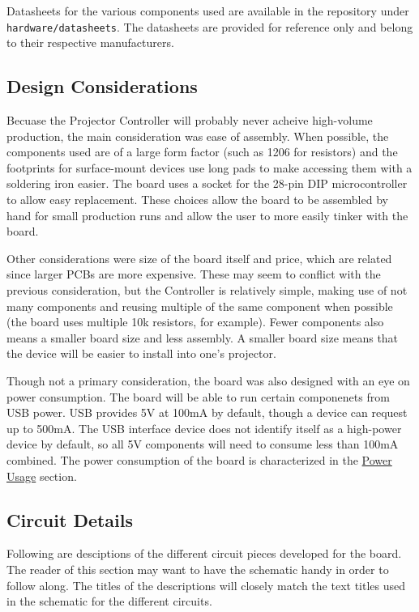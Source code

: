 \documentclass{article}
\begin{document}
Datasheets for the various components used are available in the repository under
\texttt{hardware/datasheets}.  The datasheets are provided for reference only and belong to their
respective manufacturers.

\subsection{Design Considerations} \label{ssec:DesignConsid}
Becuase the Projector Controller will probably never acheive high-volume production, the main
consideration was ease of assembly.  When possible, the components used are of a large form factor
(such as 1206 for resistors) and the footprints for surface-mount devices use long pads to make
accessing them with a soldering iron easier.  The board uses a socket for the 28-pin DIP
microcontroller to allow easy replacement.  These choices allow the board to be assembled by hand
for small production runs and allow the user to more easily tinker with the board.

Other considerations were size of the board itself and price, which are related since larger PCBs
are more expensive.  These may seem to conflict with the previous consideration, but the Controller
is relatively simple, making use of not many components and reusing multiple of the same component
when possible (the board uses multiple 10k\textOmega{} resistors, for example).  Fewer components also
means a smaller board size and less assembly.  A smaller board size means that the device will be
easier to install into one's projector.

Though not a primary consideration, the board was also designed with an eye on power consumption.
The board will be able to run certain componenets from USB power.  USB provides 5V at 100mA by
default, though a device can request up to 500mA.  The USB interface device does not identify itself
as a high-power device by default, so all 5V components will need to consume less than 100mA
combined.  The power consumption of the board is characterized in the
\hyperref[ssec:PowerUsage]{Power Usage} section.

\subsection{Circuit Details} \label{ssec:CircuitDetails}
Following are desciptions of the different circuit pieces developed for the board.  The reader of
this section may want to have the schematic handy in order to follow along.  The titles of the
descriptions will closely match the text titles used in the schematic for the different circuits.
\end{document}
